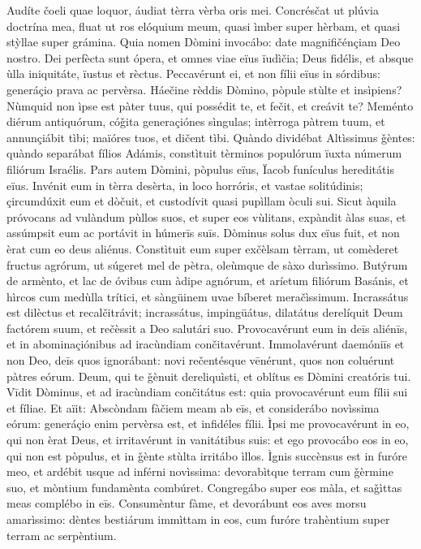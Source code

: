 Audíte čoeli quae loquor, áudiat tèrra vèrba oris mei.
Concrésčat ut plúvia doctrína mea, fluat ut ros elóquium meum, quasi ìmber super hèrbam, et quasi stỳllae super grámina.
Quia nomen Dòmini invocábo: date magnifičénçiam Deo nostro.
Dei perfècta sunt ópera, et omnes viae eïus ïudìčia; Deus fidélis, et absque ùlla iniquitáte, ïustus et rèctus.
Peccavérunt ei, et non fílii eïus in sórdibus: generáçio prava ac pervèrsa.
Háečine rèddis Dòmino, pòpule stùlte et insìpiens? Nùmquid non ìpse est pàter tuus, qui possédit te, et fečit, et creávit te?
Meménto diérum antiquórum, cóǧita generaçiónes sìngulas; intèrroga pàtrem tuum, et annunçiábit tìbi; maïóres tuos, et dičent tìbi.
Quàndo dividébat Altìssimus ǧèntes: quàndo separábat fílios Adámis, constìtuit tèrminos populórum ïuxta númerum filiórum Israélis.
Pars autem Dòmini, pòpulus eïus, Ïacob funículus hereditátis eïus.
Invénit eum in tèrra desèrta, in loco horróris, et vastae solitúdinis; çircumdúxit eum et dòčuit, et custodívit quasi pupìllam òculi sui.
Sicut àquila próvocans ad vulàndum pùllos suos, et super eos vùlitans, expàndit àlas suas, et assúmpsit eum ac portávit in húmerīs suīs.
Dòminus solus dux eïus fuit, et non èrat cum eo deus aliénus.
Constìtuit eum super exčèlsam tèrram, ut comèderet fructus agrórum, ut súgeret mel de pètra, oleùmque de sàxo durìssimo.
Butýrum de armènto, et lac de óvibus cum àdipe agnórum, et aríetum filiórum Basánis, et hìrcos cum medùlla trítici, et sàngüinem uvae bíberet meračìssimum.
Incrassátus est dilèctus et recalčitrávit; incrassátus, impingüátus, dilatátus derelíquit Deum factórem suum, et rečèssit a Deo salutári suo.
Provocavérunt eum in deīs aliénīs, et in abominaçiónibus ad iracùndiam cončitavérunt.
Immolavérunt daemóniīs et non Deo, deīs quos ignorábant: novi rečentésque vēnérunt, quos non coluérunt pàtres eórum.
Deum, qui te ǧènuit dereliquìsti, et oblítus es Dòmini creatóris tui.
Vīdit Dòminus, et ad iracùndiam cončitátus est: quia provocavérunt eum fílii sui et fíliae.
Et aïit: Abscòndam fàčiem meam ab eīs, et considerábo novìssima eórum: generáçio enim pervèrsa est, et infidéles fílii.
Ìpsi me provocavérunt in eo, qui non èrat Deus, et irritavérunt in vanitátibus suis: et ego provocábo eos in eo, qui non est pòpulus, et in ǧènte stùlta irritábo ìllos.
Ìgnis succènsus est in furóre meo, et ardébit usque ad inférni novìssima: devorabìtque terram cum ǧèrmine suo, et mòntium fundamènta combúret.
Congregábo super eos màla, et saǧìttas meas complébo in eīs.
Consumèntur fàme, et devorábunt eos aves morsu amarìssimo: dèntes bestiárum immìttam in eos, cum furóre trahèntium super terram ac serpèntium.
